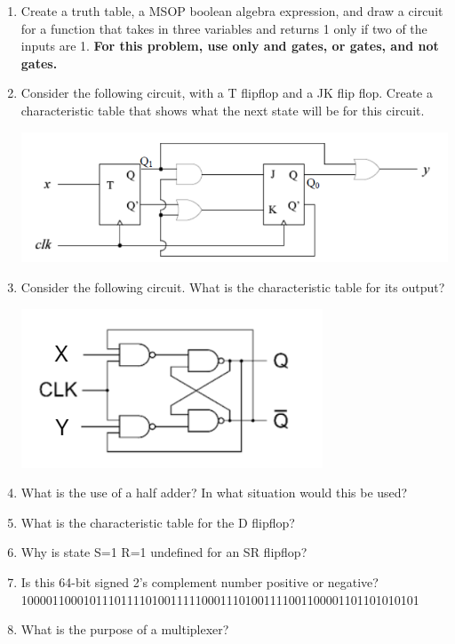 \documentclass[10pt]{article}
\begin{document}
\begin{itemize}
\begin{enumerate}
\item Create a truth table, a MSOP boolean algebra expression, and draw a circuit for a function that takes in three variables and returns 1 only if two of the inputs are 1. \textbf{For this problem, use only and gates, or gates, and not gates.}

\item Consider the following circuit, with a T flipflop and a JK flip flop.  Create a characteristic table that shows what the next state will be for this circuit. 

\includegraphics[scale=.8]{ExampleFFProblem.png}

\item Consider the following circuit.  What is the characteristic table for its output?

\includegraphics[scale=.8]{FlipFlopBehaviourProblemWithLabels.png}

\item What is the use of a half adder?  In what situation would this be used?

\item What is the characteristic table for the D flipflop?

\item Why is state S=1 R=1 undefined for an SR flipflop?

\item Is this 64-bit signed 2's complement number positive or negative? \\
1000011000101110111101001111100011101001111001100001101101010101

\item What is the purpose of a multiplexer?


\end{enumerate}
\end{itemize}
\end{document}
